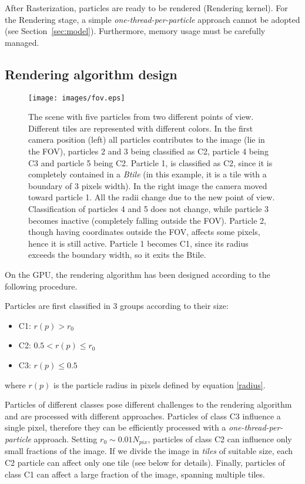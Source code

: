 \documentclass[1p]{elsarticle}
\begin{document}
After Rasterization, particles are ready to be rendered (Rendering kernel).
For the Rendering stage, a simple {\it one-thread-per-particle} approach
cannot be adopted (see Section~\ref{sec:model}). Furthermore, memory usage must be carefully managed.

\subsection{Rendering algorithm design}
\label{sec:design}

\begin{figure}
\centering
\texttt{[image: images/fov.eps]}
\caption{The scene with five particles from two different points of view. Different tiles are 
represented with different colors. In the first camera position
(left) all particles contributes to the image (lie in the FOV), particles 2 and 3
being classified as C2, particle 4 being C3 and particle 5 being C2. Particle 1, is classified
as C2, since it is completely contained in a {\it Btile} (in this example, it is a tile with a boundary of 3 pixels width). In the right
image the camera moved toward particle 1. All the radii change due to the new point
of view. Classification of particles 4 and 5 does not change, while particle 3 
becomes inactive (completely falling outside the FOV). Particle 2, though 
having coordinates outside the FOV, affects some pixels, hence it is still active.
Particle 1 becomes C1, since its radius exceeds the boundary width, so it exits the Btile. 
}
\label{fig:fov}
\end{figure}


On the GPU, the rendering algorithm has been designed according to the following procedure.

Particles are first classified in 3 groups according to their size:
\begin{itemize}
\item 
C1: $r(p) > r_0$
\item
C2: $0.5 < r(p) \le r_0$
\item
C3: $r(p) \le 0.5$
\end{itemize}
where $r(p)$ is the particle radius in pixels defined by equation \eqref{radius}.

Particles of different classes pose different challenges to the rendering 
algorithm and are processed with different approaches. Particles of class C3 
influence a single pixel, therefore they can be efficiently 
processed with a {\it one-thread-per-particle} approach. Setting $r_0 \sim 0.01 N_{pix}$, 
particles of class C2 can influence only small fractions of the image. If 
we divide the image in {\it tiles} of suitable size, each C2 particle can affect 
only one tile (see below for details). Finally, particles of class C1 can affect 
a large fraction of the image, spanning multiple tiles.
\end{document}
